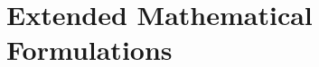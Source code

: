 \documentclass{article}
\theoremstyle{plain}
\theoremstyle{definition}
\theoremstyle{remark}
\begin{document}










\newpage
\appendix
\onecolumn
\section{Extended Mathematical Formulations}
\end{document}
